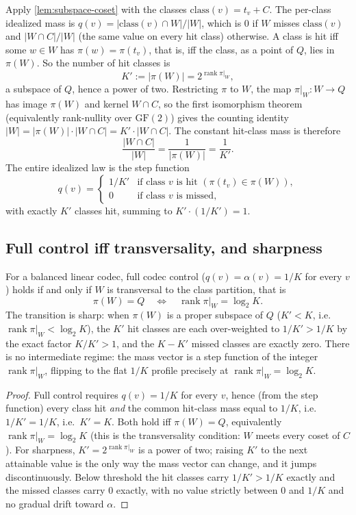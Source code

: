 \documentclass[sigconf,nonacm,anonymous,balance=false]{acmart}
\newcommand{\GF}{\mathrm{GF}(2)}
\newcommand{\class}{\mathrm{class}}
\DeclareMathOperator{\rank}{rank}
\newcommand{\W}{W}                          %
\newcommand{\proj}{\pi}                     %
\newcommand{\Quot}{Q}                       %
\newcommand{\al}{\alpha}                    %
\newcommand{\inter}{\cap}
\begin{document}
Apply \cref{lem:subspace-coset} with the classes $\class(v) = t_v + C$. The per-class
idealized mass is $q(v) = |\class(v) \inter \W| / |\W|$, which is $0$ if $\W$ misses
$\class(v)$ and $|\W \inter C| / |\W|$ (the same value on every hit class) otherwise. A
class is hit iff some $w \in \W$ has $\proj(w) = \proj(t_v)$, that is, iff the class,
as a point of $\Quot$, lies in $\proj(\W)$. So the number of hit classes is
\[
  K' := |\proj(\W)| = 2^{\rank \proj|_{\W}},
\]
a subspace of $\Quot$, hence a power of two. Restricting $\proj$ to $\W$, the map
$\proj|_{\W} : \W \to \Quot$ has image $\proj(\W)$ and kernel $\W \inter C$, so the
first isomorphism theorem (equivalently rank-nullity over $\GF$) gives the counting
identity $|\W| = |\proj(\W)| \cdot |\W \inter C| = K' \cdot |\W \inter C|$. The constant
hit-class mass is therefore
\[
  \frac{|\W \inter C|}{|\W|} = \frac{1}{|\proj(\W)|} = \frac{1}{K'}.
\]
The entire idealized law is the step function
\[
  q(v) =
  \begin{cases}
    1/K' & \text{if class } v \text{ is hit } (\proj(t_v) \in \proj(\W)), \\
    0 & \text{if class } v \text{ is missed},
  \end{cases}
\]
with exactly $K'$ classes hit, summing to $K' \cdot (1/K') = 1$.

\subsection{Full control iff transversality, and sharpness}

\begin{theorem}
\label{thm:threshold}
For a balanced linear codec, full codec control ($q(v) = \al(v) = 1/K$ for every $v$)
holds if and only if $\W$ is transversal to the class partition, that is
\[
  \proj(\W) = \Quot \quad\Longleftrightarrow\quad \rank \proj|_{\W} = \log_2 K.
\]
The transition is sharp: when $\proj(\W)$ is a proper subspace of $\Quot$ ($K' < K$,
i.e.\ $\rank \proj|_{\W} < \log_2 K$), the $K'$ hit classes are each over-weighted to
$1/K' > 1/K$ by the exact factor $K/K' > 1$, and the $K - K'$ missed classes are
exactly zero. There is no intermediate regime: the mass vector is a step function of
the integer $\rank \proj|_{\W}$, flipping to the flat $1/K$ profile precisely at
$\rank \proj|_{\W} = \log_2 K$.
\end{theorem}

\begin{proof}
Full control requires $q(v) = 1/K$ for every $v$, hence (from the step function) every
class hit \emph{and} the common hit-class mass equal to $1/K$, i.e.\ $1/K' = 1/K$, i.e.\
$K' = K$. Both hold iff $\proj(\W) = \Quot$, equivalently $\rank \proj|_{\W} = \log_2 K$
(this is the transversality condition: $\W$ meets every coset of $C$). For sharpness,
$K' = 2^{\rank \proj|_{\W}}$ is a power of two; raising $K'$ to the next attainable
value is the only way the mass vector can change, and it jumps discontinuously. Below
threshold the hit classes carry $1/K' > 1/K$ exactly and the missed classes carry $0$
exactly, with no value strictly between $0$ and $1/K$ and no gradual drift toward
$\al$.
\end{proof}
\end{document}
